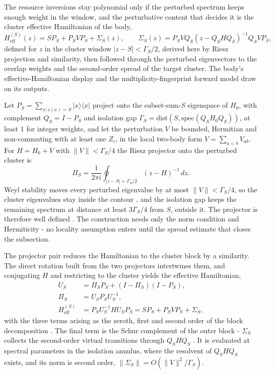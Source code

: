 The resource inversions stay polynomial only if the perturbed spectrum keeps enough weight in the window, and the perturbative content that decides it is the cluster effective Hamiltonian of the body,
\begin{equation*}
H_{\mathrm{eff}}^{(S)}(z) = S P_S + P_S V P_S + \Sigma_S(z) , \qquad
\Sigma_S(z) = P_S V Q_S \left( z - Q_S H Q_S \right)^{-1} Q_S V P_S ,
\end{equation*}
defined for $z$ in the cluster window $|z - S| < \Gamma_S/2$, derived here by Riesz projection and similarity, then followed through the perturbed eigenvectors to the overlap weights and the second-order spread of the target cluster. The body's effective-Hamiltonian display and the multiplicity-fingerprint forward model draw on its outputs.

Let $P_S = \sum_{x : s(x) = S} |x\rangle\langle x|$ project onto the subset-sum-$S$ eigenspace of $H_0$, with complement $Q_S = I - P_S$ and isolation gap $\Gamma_S = \mathrm{dist}(S, \mathrm{spec}(Q_S H_0 Q_S))$, at least $1$ for integer weights, and let the perturbation $V$ be bounded, Hermitian and non-commuting with at least one $Z_i$, in the local two-body form $V = \sum_{a < b} V_{ab}$. For $H = H_0 + V$ with $\|V\| < \Gamma_S/4$ the Riesz projector onto the perturbed cluster is
\begin{equation*}
\Pi_S = \frac{1}{2\pi i} \oint_{|z - S| = \Gamma_S/2} (z - H)^{-1} \, dz .
\end{equation*}
Weyl stability moves every perturbed eigenvalue by at most $\|V\| < \Gamma_S/4$, so the cluster eigenvalues stay inside the contour \cite{bhatia1997matrix}, and the isolation gap keeps the remaining spectrum at distance at least $3\Gamma_S/4$ from $S$, outside it. The projector is therefore well defined \cite{kato1995perturbation}. The construction needs only the norm condition and Hermiticity - no locality assumption enters until the spread estimate that closes the subsection.

The projector pair reduces the Hamiltonian to the cluster block by a similarity. The direct rotation built from the two projectors intertwines them, and conjugating $H$ and restricting to the cluster yields the effective Hamiltonian,
\begin{align*}
U_S &= \Pi_S P_S + (I - \Pi_S)(I - P_S) , \\
\Pi_S &= U_S P_S U_S^{-1} , \\
H_{\mathrm{eff}}^{(S)} &= P_S U_S^{-1} H U_S P_S = S P_S + P_S V P_S + \Sigma_S ,
\end{align*}
with the three terms arising as the zeroth, first and second order of the block decomposition \cite{kato1995perturbation}. The final term is the Schur complement of the outer block - $\Sigma_S$ collects the second-order virtual transitions through $Q_S H Q_S$ \cite{horn2013matrix}. It is evaluated at spectral parameters in the isolation annulus, where the resolvent of $Q_S H Q_S$ exists, and its norm is second order, $\|\Sigma_S\| = O(\|V\|^2 / \Gamma_S)$.

